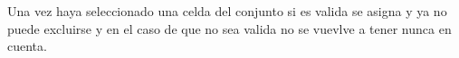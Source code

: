 Una vez haya seleccionado una celda del conjunto si es valida se asigna y ya no puede excluirse y en el caso de que no sea valida no se vuevlve a tener nunca en cuenta.
